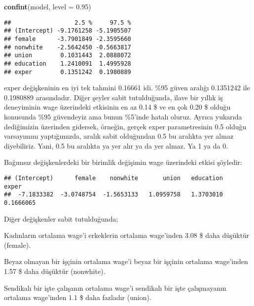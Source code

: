 \documentclass[
]{book}
\newenvironment{Shaded}{\begin{snugshade}}{\end{snugshade}}
\newcommand{\DataTypeTok}[1]{\textcolor[rgb]{0.13,0.29,0.53}{#1}}
\newcommand{\FloatTok}[1]{\textcolor[rgb]{0.00,0.00,0.81}{#1}}
\newcommand{\KeywordTok}[1]{\textcolor[rgb]{0.13,0.29,0.53}{\textbf{#1}}}
\newcommand{\NormalTok}[1]{#1}
\newcommand{\OperatorTok}[1]{\textcolor[rgb]{0.81,0.36,0.00}{\textbf{#1}}}
\begin{document}
\begin{Shaded}
\begin{Highlighting}[]
\KeywordTok{confint}\NormalTok{(model, }\DataTypeTok{level =} \FloatTok{0.95}\NormalTok{)}
\end{Highlighting}
\end{Shaded}

\begin{verbatim}
##                  2.5 %     97.5 %
## (Intercept) -9.1761258 -5.1905507
## female      -3.7901849 -2.3595660
## nonwhite    -2.5642450 -0.5663817
## union        0.1031443  2.0888072
## education    1.2410091  1.4995928
## exper        0.1351242  0.1980889
\end{verbatim}

exper değişkeninin en iyi tek tahmini 0.16661 idi. \%95 güven aralığı 0.1351242 ile 0.1980889 arasındadır. Diğer şeyler sabit tutulduğunda, ilave bir yıllık iş deneyiminin wage üzerindeki etkisinin en az 0.14 \$ ve en çok 0.20 \$ olduğu konusunda \%95 güvendeyiz ama bunun \%5'inde hatalı oluruz. Ayrıca yukarıda dediğimizin üzerinden gidersek, örneğin, gerçek exper parametresinin 0.5 olduğu varsayımını yaptığımızda, aralık sabit olduğundan 0.5 bu aralıkta yer almaz diyebiliriz. Yani, 0.5 bu aralıkta ya yer alır ya da yer almaz. Ya 1 ya da 0.

Bağımsız değişkenlerdeki bir birimlik değişimin wage üzerindeki etkisi şöyledir:

\begin{Shaded}
\end{Shaded}

\begin{verbatim}
## (Intercept)      female    nonwhite       union   education       exper 
##  -7.1833382  -3.0748754  -1.5653133   1.0959758   1.3703010   0.1666065
\end{verbatim}

Diğer değişkenler sabit tutulduğunda;

Kadınların ortalama wage'i erkeklerin ortalama wage'inden 3.08 \$ daha düşüktür (female).

Beyaz olmayan bir işçinin ortalama wage'i beyaz bir işçinin ortalama wage'inden 1.57 \$ daha düşüktür (nonwhite).

Sendikalı bir işte çalışanın ortalama wage'i sendikalı bir işte çalışmayanın ortalama wage'inden 1.1 \$ daha fazladır (union).
\end{document}
